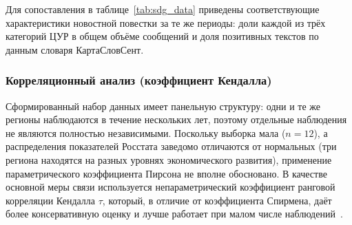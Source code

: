 \documentclass[master, och, coursework]{SCWorks1}
\begin{document}
Для сопоставления в таблице~\ref{tab:sdg_data} приведены соответствующие характеристики новостной повестки за те же периоды: доли каждой из трёх категорий ЦУР в общем объёме сообщений и доля позитивных текстов по данным словаря КартаСловСент.

\begin{table}[H]
\caption{Характеристики новостной повестки по категориям ЦУР (2020--2023, КартаСловСент)}
\label{tab:sdg_data}
\centering{}
\end{table}

\subsubsection{Корреляционный анализ (коэффициент Кендалла)}
Сформированный набор данных имеет панельную структуру: одни и те же регионы наблюдаются в течение нескольких лет, поэтому отдельные наблюдения не являются полностью независимыми. Поскольку выборка мала ($n=12$), а распределения показателей Росстата заведомо отличаются от нормальных (три региона находятся на разных уровнях экономического развития), применение параметрического коэффициента Пирсона не вполне обосновано. В качестве основной меры связи используется непараметрический коэффициент ранговой корреляции Кендалла $\tau$, который, в отличие от коэффициента Спирмена, даёт более консервативную оценку и лучше работает при малом числе наблюдений~\cite{Funk2024}.
\end{document}
